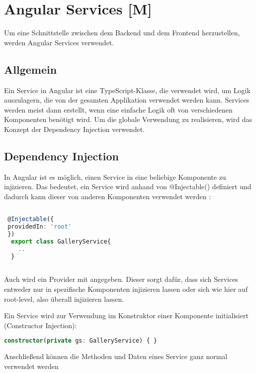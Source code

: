 \section{Angular Services [M]}
Um eine Schnittstelle zwischen dem Backend und dem Frontend herzustellen, werden Angular Services verwendet.

\subsection{Allgemein}
Ein Service in Angular ist eine TypeScript-Klasse, die verwendet wird, um Logik auszulagern, die von der gesamten Applikation verwendet werden kann. Services werden meist dann erstellt, wenn eine einfache Logik oft von verschiedenen Komponenten benötigt wird. Um die globale Verwendung zu realisieren, wird das Konzept der Dependency Injection verwendet. \cite{AngularBuch} \cite{AngularArchitectureService}

\subsection{Dependency Injection}
In Angular ist es möglich, einen Service in eine beliebige Komponente zu injizieren. Das bedeutet, ein Service wird anhand von @Injectable() definiert und dadurch kann dieser von anderen Komponenten verwendet werden \cite{AngularBuch}:

\begin{lstlisting}[caption={Eine Klasse Injectable machen},  language=TypeScript,label=lst:impl:injectable]   
    
 @Injectable({
 providedIn: 'root'
 })
  export class GalleryService{
    ..
  }
   
\end{lstlisting}

Auch wird ein Provider mit angegeben. Dieser sorgt dafür, dass sich Services entweder nur in spezifische Komponenten injizieren lassen oder sich wie hier auf root-level, also überall injizieren lassen. \cite{AngularBuch}

Ein Service wird zur Verwendung im Konstruktor einer Komponente initialisiert (Constructor Injection): 

\begin{lstlisting}[caption={Constructor Injection},  language=TypeScript,label=lst:impl:concstructorinjection]   
    constructor(private gs: GalleryService) { }
\end{lstlisting}
Anschließend können die Methoden und Daten eines Service ganz normal verwendet werden

